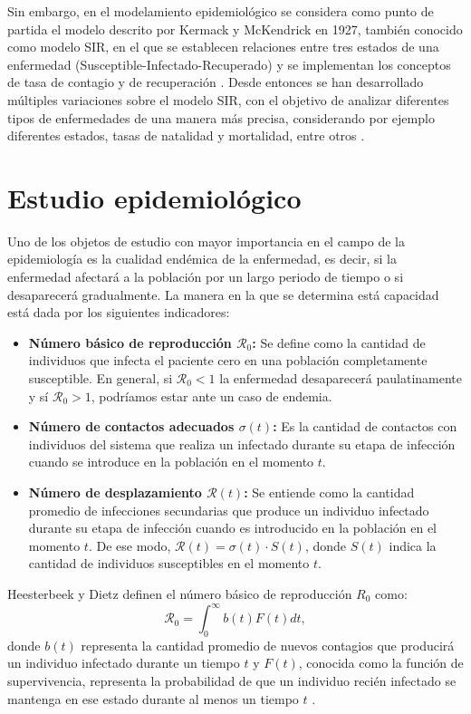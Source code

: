 Sin embargo, en el modelamiento epidemiológico se considera como punto de partida el modelo descrito por Kermack y McKendrick en 1927, también conocido como modelo SIR, en el que se establecen relaciones entre tres estados de una enfermedad (Susceptible-Infectado-Recuperado) y se implementan los conceptos de tasa de contagio y de recuperación \cite{malariaSIR}. Desde entonces se han desarrollado múltiples variaciones sobre el modelo SIR, con el objetivo de analizar diferentes tipos de enfermedades de una manera más precisa, considerando por ejemplo diferentes estados, tasas de natalidad y mortalidad, entre otros \cite{diego2010}.

\section{Estudio epidemiológico}\label{sec:EstudioEpidemiológico}
Uno de los objetos de estudio con mayor importancia en el campo de la epidemiología es la cualidad endémica de la enfermedad, es decir, si la enfermedad afectará a la población por un largo periodo de tiempo o si desaparecerá gradualmente. La manera en la que se determina está capacidad está dada por los siguientes indicadores:

\begin{itemize}
    \item \textbf{Número básico de reproducción $\mathcal{R}_0$:} Se define como la cantidad de individuos que infecta el paciente cero en una población completamente susceptible. En general, si $\mathcal{R}_0<1$ la enfermedad desaparecerá paulatinamente y sí $\mathcal{R}_0>1$, podríamos estar ante un caso de endemia.
    \item \textbf{Número de contactos adecuados $\sigma(t)$:} Es la cantidad de contactos con individuos del sistema que realiza un infectado durante su etapa de infección cuando se introduce en la población en el momento $t$.
    \item \textbf{Número de desplazamiento $\mathcal{R}(t)$:} Se entiende como la cantidad promedio de infecciones secundarias que produce un individuo infectado durante su etapa de infección cuando es introducido en la población en el momento $t$. De ese modo, $\mathcal{R}(t) = \sigma(t)\cdot S(t)$, donde $S(t)$ indica la cantidad de individuos susceptibles en el momento $t$.
\end{itemize}

Heesterbeek y Dietz definen el número básico de reproducción $R_0$ como:
\begin{equation}\label{eq:R0}
    \mathcal{R}_0 = \int_0^\infty b(t)F(t) dt,
\end{equation}
donde $b(t)$ representa la cantidad promedio de nuevos contagios que producirá un individuo infectado durante un tiempo $t$ y $F(t)$, conocida como la función de supervivencia, representa la probabilidad de que un individuo recién infectado se mantenga en ese estado durante al menos un tiempo $t$ \cite{conceptOfR0, perspectivesOnR0}.


